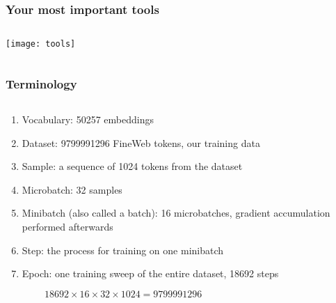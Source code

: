 \documentclass[
	notes=none,
	aspectratio=169
]{beamer}
\begin{document}

\begin{frame}
\frametitle{Your most important tools}

\begin{columns}[T]
\begin{column}[T]{0.7\textwidth}
\setlength{\parskip}{0.5em}

\vspace{0.0cm}
\texttt{[image: tools]}


\end{column}
\end{columns}

\end{frame}
\note{
}


\begin{frame}
\frametitle{Terminology}

\begin{columns}[T]
\begin{column}[T]{1.0\textwidth}
\setlength{\parskip}{0.5em}

\vspace{0.0cm}
\begin{enumerate}
\setlength{\parskip}{0.0em}
\item Vocabulary: 50257 embeddings
\item Dataset: 9799991296 FineWeb tokens, our training data
\item Sample: a sequence of 1024 tokens from the dataset
\item Microbatch: 32 samples
\item Minibatch (also called a batch): 16 microbatches, gradient accumulation performed afterwards
\item Step: the process for training on one minibatch
\item Epoch: one training sweep of the entire dataset, 18692 steps
\end{enumerate}
\vspace{0.3cm}
$
\qquad \qquad 18692 \times 16 \times 32 \times 1024 = 9799991296
$

\end{column}
\end{columns}

\end{frame}
\note{
}

\end{document}
